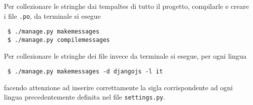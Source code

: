 Per collezionare le stringhe dai tempaltes di tutto il progetto, compilarle e creare i file \texttt{.po}, da terminale si esegue
\begin{footnotesize}
\begin{verbatim}
 $ ./manage.py makemessages
 $ ./manage.py compilemessages
\end{verbatim}
\end{footnotesize}

Per collezionare le stringhe dei file {\js} invece da terminale si esegue, per ogni lingua
\begin{footnotesize}
\begin{verbatim}
 $ ./manage.py makemessages -d djangojs -l it
\end{verbatim}
\end{footnotesize}
facendo attenzione ad inserire correttamente la sigla corrispondente ad ogni lingua precedentemente definita nel file \texttt{settings.py}.